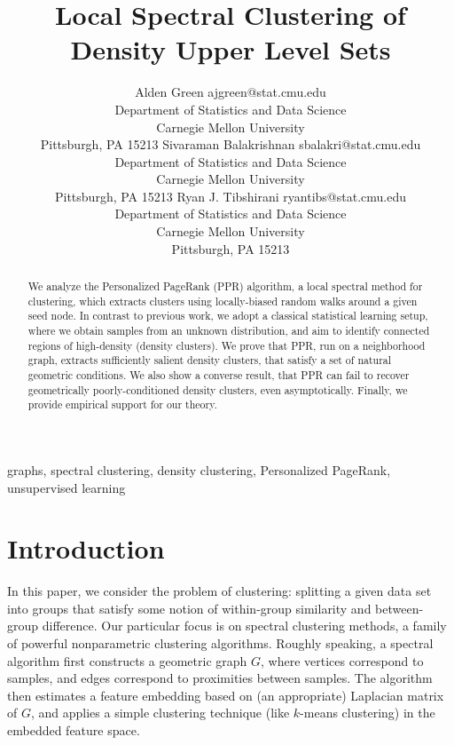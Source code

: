 \documentclass[11pt,twoside]{article}
\newcommand{\1}{\mathbbm{1}}
\begin{document}
\title{Local Spectral Clustering of Density Upper Level Sets}

\author{\name Alden Green \email ajgreen@stat.cmu.edu \\
	\addr Department of Statistics and Data Science\\
	Carnegie Mellon University\\
	Pittsburgh, PA 15213
	\AND
	\name Sivaraman Balakrishnan \email sbalakri@stat.cmu.edu \\
	\addr Department of Statistics and Data Science\\
	Carnegie Mellon University\\
	Pittsburgh, PA 15213
	\AND
	Ryan J. Tibshirani \email ryantibs@stat.cmu.edu \\
	\addr Department of Statistics and Data Science\\
	Carnegie Mellon University\\
	Pittsburgh, PA 15213}

\maketitle

\begin{abstract}
We analyze the Personalized PageRank (PPR) algorithm, a local spectral method
for clustering, which extracts clusters using locally-biased random walks around
a given seed node.  In contrast to previous work, we adopt a classical
statistical learning setup, where we obtain samples from an unknown
distribution, and aim to identify connected regions of high-density (density
clusters).  We prove that PPR, run on a neighborhood graph, extracts
sufficiently salient density clusters, that satisfy a set of natural geometric
conditions. We also show a converse result, that PPR can fail to recover
geometrically poorly-conditioned density clusters, even asymptotically. Finally,
we provide empirical support for our theory.
\end{abstract}

\begin{keywords}
	graphs, spectral clustering, density clustering, Personalized PageRank, unsupervised learning
\end{keywords}


\section{Introduction}
\label{sec: introduction}

In this paper, we consider the problem of clustering: splitting a given data set
into groups that satisfy some notion of within-group similarity and
between-group difference.  Our particular focus is on spectral clustering
methods, a family of powerful nonparametric clustering algorithms. Roughly
speaking, a spectral algorithm first constructs a geometric graph $G$, where
vertices correspond to samples, and edges correspond to proximities between
samples. The algorithm then estimates a feature embedding based on (an
appropriate) Laplacian matrix of $G$, and applies a simple clustering technique
(like $k$-means clustering) in the embedded feature space.
\end{document}
